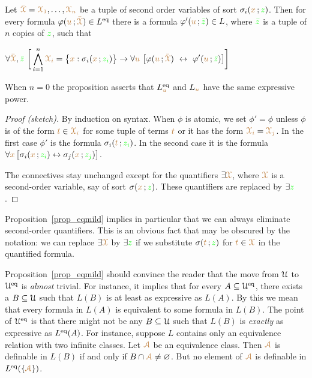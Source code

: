 \documentclass[creche.tex]{subfiles}
\begin{document}
\begin{proposition}\label{prop_eqmild}
Let ${\color{brown}\bar{\EuScript X}}={\color{brown}\EuScript X_1},\dots,{\color{brown}\EuScript X_n}$ be a tuple of second order variables of sort $\sigma_i({\color{brown} x}\,;{\color{green} z})$.
Then for every formula $\varphi({\color{brown} u}\,;{\color{brown}\bar {\EuScript X}})\in L^{{\rm eq}}$ there is a formula $\varphi'({\color{brown} u}\,;{\color{green}\bar z})\in L$, where ${\color{green}\bar z}$ is a tuple of $n$ copies of ${\color{green} z}$, such that 

\hfil$\displaystyle\A {\vl\bar\X},{\gr\bar z}\ \bigg[\bigwedge^n_{i=1}{\vl\X_i}=\big\{{\mr x}:\sigma_i({\mr x}\,;{\gr z_i})\big\}\imp\A {\mr u}\ \big[\phi({\mr u}\,;{\vl\bar\X})\ \iff\ \phi'({\mr u}\,;{\gr\bar z})\big]\bigg]$

\end{proposition}

When $n=0$ the proposition asserts that $L_{{\color{brown} u}}^{{\rm eq}}$ and $L_{{\color{brown} u}}$ have the same expressive power.

\begin{proof}[Proof (sketch)]
By induction on syntax.
When $\phi$ is atomic, we set $\phi'=\phi$ unless $\phi$ is of the form ${\color{brown} t}\in {\color{brown}\EuScript X_i}$ for some tuple of terms ${\color{brown} t}$ or it has the form ${\color{brown}\EuScript X_i}={\color{brown}\EuScript X_j}$.
In the first case $\phi'$ is the formula $\sigma_i({\color{brown} t}\,;{\color{green} z_i})$.
In the second case it is the formula $\forall {\color{brown}x}\,\big[\sigma_i({\color{brown} x}\,;{\color{green} z_i}) \leftrightarrow\sigma_j({\color{brown} x}\,;{\color{green} z_j})\big]$. 

The connectives stay unchanged except for the quantifiers $\exists {\color{brown}\EuScript X}$, where ${\color{brown}\EuScript X}$ is a second-order variable, say of sort $\sigma({\color{brown} x}\,;{\color{green} z})$.
These quantifiers are replaced by $\exists{\color{green}z}$.
\end{proof}

Proposition~\ref{prop_eqmild} implies in particular that we can always eliminate second-order quantifiers.
This is an obvious fact that may be obscured by the notation: we can replace $\exists {\color{brown}\EuScript X}$ by $\exists {\color{green}z}$ if we substitute  $\sigma({\color{brown} t}\,;{\color{green} z})$ for ${\color{brown} t}\in {\color{brown}\EuScript X}$ in the quantified formula.




\begin{remark}\label{rem_eqmild}
Proposition~\ref{prop_eqmild} should convince the reader that the move from $\EuScript U$ to $\EuScript U^{{\rm eq}}$ is \textit{almost\/} trivial.
For instance, it implies that for every $A\subseteq\EuScript U^{{\rm eq}}$, there exists a $B\subseteq\EuScript U$ such that $L(B)$ is at least as expressive as $L(A)$.
By this we mean that every formula in $L(A)$ is equivalent to some formula in $L(B)$.
The point of $\EuScript U^{{\rm eq}}$ is that there might not be any $B\subseteq\EuScript U$ such that $L(B)$ is \textit{exactly\/} as expressive as $L^{{\rm eq}}(A)$.
For instance, suppose $L$ contains only an equivalence relation with two infinite classes.
Let ${\color{brown}\EuScript A}$ be an equivalence class.
Then ${\color{brown}\EuScript A}$ is definable in $L(B)$ if and only if $B\cap {\color{brown}\EuScript A}\neq\varnothing$.
But no element of ${\color{brown}\EuScript A}$ is definable in $L^{{\rm eq}}(\{{\color{brown}\EuScript A}\})$.\QED
\end{remark}
\end{document}
